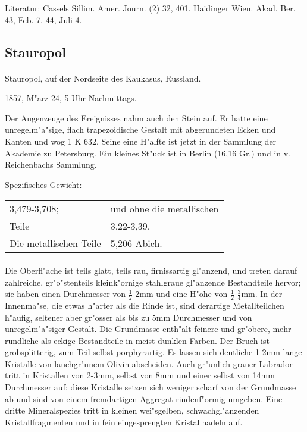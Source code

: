 \documentclass[a4paper, 11pt, oneside]{article}
\begin{document}
\footnotesize
Literatur: Cassels Sillim. Amer. Journ. (2) 32, 401. Haidinger Wien. Akad. Ber. 43, Feb. 7. 44, Juli 4.

\subsection{Stauropol}
\normalsize
\paragraph{}
Stauropol, auf der Nordseite des Kaukasus, Russland.

1857, M"arz 24, 5 Uhr Nachmittags.

Der Augenzeuge des Ereignisses nahm auch den Stein auf. Er hatte eine unregelm"a"sige, flach trapezoidische Gestalt mit abgerundeten Ecken und Kanten und wog 1 K 632. Seine eine H"alfte ist jetzt in der Sammlung der Akademie zu Petersburg. Ein kleines St"uck ist in Berlin (16,16 Gr.) und in v. Reichenbachs Sammlung.

Spezifisches Gewicht:
\begin{table}[!ht]
    \centering
    \begin{tabular}{l l}
        3,479-3,708; & und ohne die metallischen\\
        Teile & 3,22-3,39.\\
        Die metallischen Teile & 5,206 Abich.
    \end{tabular}
\end{table}
\paragraph{}
Die Oberfl"ache ist teils glatt, teils rau, firnissartig gl"anzend, und treten darauf zahlreiche, gr"o"stenteils kleink"ornige stahlgraue gl"anzende Bestandteile hervor; sie haben einen Durchmesser von $\frac{1}{2}$-2mm und eine H"ohe von $\frac{1}{2}$-$\frac{3}{4}$mm. In der Innenma"se, die etwas h"arter als die Rinde ist, sind derartige Metallteilchen h"aufig, seltener aber gr"osser als bis zu 5mm Durchmesser und von unregelm"a"siger Gestalt. Die Grundmasse enth"alt feinere und gr"obere, mehr rundliche als eckige Bestandteile in meist dunklen Farben. Der Bruch ist grobsplitterig, zum Teil selbst porphyrartig. Es lassen sich deutliche 1-2mm lange Kristalle von lauchgr"unem Olivin abscheiden. Auch gr"unlich grauer Labrador tritt in Kristallen von 2-3mm, selbst von 8mm und einer selbst von 14mm Durchmesser auf; diese Kristalle setzen sich weniger scharf von der Grundmasse ab und sind von einem fremdartigen Aggregat rindenf"ormig umgeben. Eine dritte Mineralspezies tritt in kleinen wei"sgelben, schwachgl"anzenden Kristallfragmenten und in fein eingesprengten Kristallnadeln auf.
\end{document}
